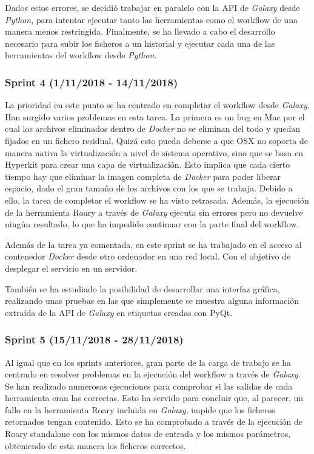 Dados estos errores, se decidió trabajar en paralelo con la API de \textit{Galaxy} desde \textit{Python}, para intentar ejecutar tanto las herramientas como el workflow de una manera menos restringida. Finalmente, se ha llevado a cabo el desarrollo necesario para subir los ficheros a un historial y ejecutar cada una de las herramientas del workflow desde \textit{Python}.

\subsubsection{Sprint 4 (1/11/2018 - 14/11/2018)}
La prioridad en este punto se ha centrado en completar el workflow desde \textit{Galaxy}. Han surgido varios problemas en esta tarea. La primera es un bug en Mac por el cual los archivos eliminados dentro de \textit{Docker} no se eliminan del todo y quedan fijados en un fichero residual. Quizá esto pueda deberse a que OSX no soporta de manera nativa la virtualización a nivel de sistema operativo, sino que se basa en Hyperkit para crear una capa de virtualización. Esto implica que cada cierto tiempo hay que eliminar la imagen completa de \textit{Docker} para poder liberar espacio, dado el gran tamaño de los archivos con los que se trabaja. Debido a ello, la tarea de completar el workflow se ha visto retrasada. Además, la ejecución de la herramienta Roary a través de \textit{Galaxy} ejecuta sin errores pero no devuelve ningún resultado, lo que ha impedido continuar con la parte final del workflow. 

Además de la tarea ya comentada, en este sprint se ha trabajado en el acceso al contenedor \textit{Docker} desde otro ordenador en una red local. Con el objetivo de desplegar el servicio en un servidor.

También se ha estudiado la posibilidad de desarrollar una interfaz gráfica, realizando unas pruebas en las que simplemente se muestra alguna información extraída de la API de \textit{Galaxy} en etiquetas creadas con PyQt.

\subsubsection{Sprint 5 (15/11/2018 - 28/11/2018)}
Al igual que en los sprints anteriores, gran parte de la carga de trabajo se ha centrado en resolver problemas en la ejecución del workflow a través de \textit{Galaxy}. Se han realizado numerosas ejecuciones para comprobar si las salidas de cada herramienta eran las correctas. Esto ha servido para concluir que, al parecer, un fallo en la herramienta Roary incluida en \textit{Galaxy}, impide que los ficheros retornados tengan contenido. Esto se ha comprobado a través de la ejecución de Roary standalone con los mismos datos de entrada y los mismos parámetros, obteniendo de esta manera los ficheros correctos.

